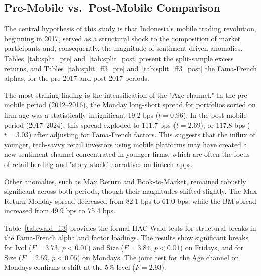 \documentclass[
	a4paper,
	10pt,
	twoside,
]{LTJournalArticle}
\begin{document}
\subsection{Pre-Mobile vs.\ Post-Mobile Comparison}

The central hypothesis of this study is that Indonesia's mobile trading revolution, beginning in 2017, served as a structural shock to the composition of market participants and, consequently, the magnitude of sentiment-driven anomalies. Tables~\ref{tab:split_pre} and~\ref{tab:split_post} present the split-sample excess returns, and Tables~\ref{tab:split_ff3_pre} and~\ref{tab:split_ff3_post} the Fama-French alphas, for the pre-2017 and post-2017 periods.

The most striking finding is the intensification of the "Age channel." In the pre-mobile period (2012--2016), the Monday long-short spread for portfolios sorted on firm age was a statistically insignificant 19.2 bps ($t=0.96$). In the post-mobile period (2017--2024), this spread exploded to 111.7 bps ($t=2.69$), or 117.8 bps ($t=3.03$) after adjusting for Fama-French factors. This suggests that the influx of younger, tech-savvy retail investors using mobile platforms may have created a new sentiment channel concentrated in younger firms, which are often the focus of retail herding and "story-stock" narratives on fintech apps.

Other anomalies, such as Max Return and Book-to-Market, remained robustly significant across both periods, though their magnitudes shifted slightly. The Max Return Monday spread decreased from 82.1 bps to 61.0 bps, while the BM spread increased from 49.9 bps to 75.4 bps.

Table~\ref{tab:wald_ff3} provides the formal HAC Wald tests for structural breaks in the Fama-French alpha and factor loadings. The results show significant breaks for Ivol ($F=3.73$, $p<0.01$) and Size ($F=3.84$, $p<0.01$) on Fridays, and for Size ($F=2.59$, $p<0.05$) on Mondays. The joint test for the Age channel on Mondays confirms a shift at the 5\% level ($F=2.93$).

\begin{table}[htbp]
	\caption{Day-of-Week Excess Returns: Pre-Period (Break 2017-01, bps/month)}
	\label{tab:split_pre}
	
\end{table}

\begin{table}[htbp]
	\caption{Day-of-Week Excess Returns: Post-Period (Break 2017-01, bps/month)}
	\label{tab:split_post}
	
\end{table}
\end{document}
